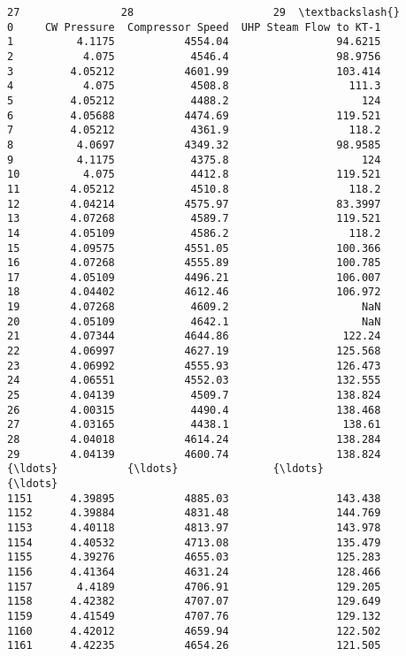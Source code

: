 \documentclass[11pt]{article}
\begin{document}
\begin{tcolorbox}[breakable, size=fbox, boxrule=.5pt, pad at break*=1mm, opacityfill=0]
\begin{Verbatim}[commandchars=\\\{\}]
               27                28                      29  \textbackslash{}
0     CW Pressure  Compressor Speed  UHP Steam Flow to KT-1
1          4.1175           4554.04                 94.6215
2           4.075            4546.4                 98.9756
3         4.05212           4601.99                 103.414
4           4.075            4508.8                   111.3
5         4.05212            4488.2                     124
6         4.05688           4474.69                 119.521
7         4.05212            4361.9                   118.2
8          4.0697           4349.32                 98.9585
9          4.1175            4375.8                     124
10          4.075            4412.8                 119.521
11        4.05212            4510.8                   118.2
12        4.04214           4575.97                 83.3997
13        4.07268            4589.7                 119.521
14        4.05109            4586.2                   118.2
15        4.09575           4551.05                 100.366
16        4.07268           4555.89                 100.785
17        4.05109           4496.21                 106.007
18        4.04402           4612.46                 106.972
19        4.07268            4609.2                     NaN
20        4.05109            4642.1                     NaN
21        4.07344           4644.86                  122.24
22        4.06997           4627.19                 125.568
23        4.06992           4555.93                 126.473
24        4.06551           4552.03                 132.555
25        4.04139            4509.7                 138.824
26        4.00315            4490.4                 138.468
27        4.03165            4438.1                  138.61
28        4.04018           4614.24                 138.284
29        4.04139           4600.74                 138.824
{\ldots}           {\ldots}               {\ldots}                     {\ldots}
1151      4.39895           4885.03                 143.438
1152      4.39884           4831.48                 144.769
1153      4.40118           4813.97                 143.978
1154      4.40532           4713.08                 135.479
1155      4.39276           4655.03                 125.283
1156      4.41364           4631.24                 128.466
1157       4.4189           4706.91                 129.205
1158      4.42382           4707.07                 129.649
1159      4.41549           4707.76                 129.132
1160      4.42012           4659.94                 122.502
1161      4.42235           4654.26                 121.505

\end{Verbatim}
\end{tcolorbox}
\end{document}
